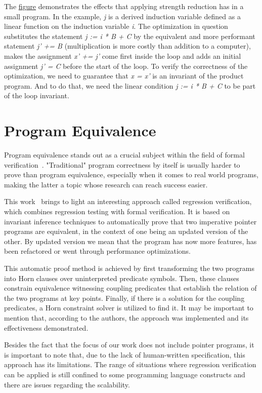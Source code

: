 The \hyperref[fig:induction_var_strength_red]{figure} demonstrates the effects that applying strength reduction has in a small program.
In the example, \emph{j} is a derived induction variable defined as a linear function on the induction variable \emph{i}.
The optimization in question substitutes the statement \emph{j := i * B + C} by the equivalent and more performant statement \emph{j' += B} (multiplication is more costly than addition to a computer), makes the assignment \emph{x' += j'} come first inside the loop and adds an initial assignment \emph{j' = C} before the start of the loop.
To verify the correctness of the optimization, we need to guarantee that \emph{x = x'} is an invariant of the product program.
And to do that, we need the linear condition \emph{j := i * B + C} to be part of the loop invariant.

\FloatBarrier
\section{Program Equivalence}
\label{sec:program_equivalence}

Program equivalence stands out as a crucial subject within the field of formal verification~\cite{DBLP:journals/fmsd/Strichman18}.
"Traditional" program correctness by itself is usually harder to prove than program equivalence, especially when it comes to real world programs, making the latter a topic whose research can reach success easier.

This work~\cite{DBLP:journals/fmsd/KlebanovRU18} brings to light an interesting approach called regression verification, which combines regression testing with formal verification.
It is based on invariant inference techniques to automatically prove that two imperative pointer programs are equivalent, in the context of one being an updated version of the other.
By updated version we mean that the program has now more features, has been refactored or went through performance optimizations.

This automatic proof method is achieved by first transforming the two programs into Horn clauses over uninterpreted predicate symbols. 
Then, these clauses constrain equivalence witnessing coupling predicates that establish the relation of the two programs at key points.
Finally, if there is a solution for the coupling predicates, a Horn constraint solver is utilized to find it.
It may be important to mention that, according to the authors, the approach was implemented and its effectiveness demonstrated.

Besides the fact that the focus of our work does not include pointer programs, it is important to note that, due to the lack of human-written specification, this approach has its limitations.
The range of situations where regression verification can be applied is still confined to some programming language constructs and there are issues regarding the scalability.
